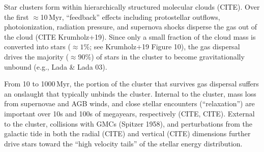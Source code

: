 \documentclass[12pt,twocolumn,tighten]{aastex63}
\begin{document}
Star clusters form within hierarchically structured molecular clouds
(CITE).  Over the first $\approx$10\,Myr, ``feedback'' effects
including protostellar outflows, photoionization, radiation pressure,
and supernova shocks disperse the gas out of the cloud (CITE
Krumholz+19).  Since only a small fraction of the cloud mass is
converted into stars ($\approx 1\%$; see Krumholz+19 Figure 10), the
gas dispersal drives the majority ($\approx$90\%) of stars in the
cluster to become gravitationally unbound (e.g., Lada \& Lada 03).

From 10 to 1000\,Myr, the portion of the cluster that survives gas
dispersal suffers an onslaught that typically unbinds the cluster.
Internal to the cluster, mass loss from supernovae and AGB winds, and
close stellar encounters (``relaxation'') are important over 10s and
100s of megayears, respectively (CITE, CITE).  External to the
cluster, collisions with GMCs (Spitzer 1958), and perturbations from
the galactic tide in both the radial (CITE) and vertical (CITE)
dimensions further drive stars toward the ``high velocity tails'' of
the stellar energy distribution.


% 
\end{document}
